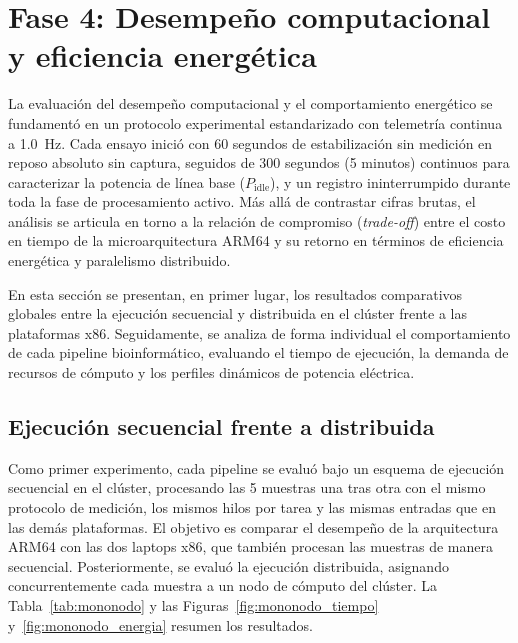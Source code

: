 \documentclass[12pt,oneside,spanish]{book}
\begin{document}
    \section{Fase 4: Desempeño computacional y eficiencia energética}
    \label{sec:fase4}
    
    La evaluación del desempeño computacional y el comportamiento energético se fundamentó en un protocolo experimental estandarizado con telemetría continua a 1.0~Hz. Cada ensayo inició con 60 segundos de estabilización sin medición en reposo absoluto sin captura, seguidos de 300 segundos (5 minutos) continuos para caracterizar la potencia de línea base ($P_{\text{idle}}$), y un registro ininterrumpido durante toda la fase de procesamiento activo. Más allá de contrastar cifras brutas, el análisis se articula en torno a la relación de compromiso (\textit{trade-off}) entre el costo en tiempo de la microarquitectura ARM64 y su retorno en términos de eficiencia energética y paralelismo distribuido.
    
    En esta sección se presentan, en primer lugar, los resultados comparativos globales entre la ejecución secuencial y distribuida en el clúster frente a las plataformas x86. Seguidamente, se analiza de forma individual el comportamiento de cada pipeline bioinformático, evaluando el tiempo de ejecución, la demanda de recursos de cómputo y los perfiles dinámicos de potencia eléctrica.
    
    
    \subsection{Ejecución secuencial frente a distribuida}
    
    Como primer experimento, cada pipeline se evaluó bajo un esquema de ejecución secuencial en el clúster, procesando las 5 muestras una tras otra con el mismo protocolo de medición, los mismos hilos por tarea y las mismas entradas que en las demás plataformas. El objetivo es comparar el desempeño de la arquitectura ARM64 con las dos laptops x86, que también procesan las muestras de manera secuencial. Posteriormente, se evaluó la ejecución distribuida, asignando concurrentemente cada muestra a un nodo de cómputo del clúster. La Tabla~\ref{tab:mononodo} y las Figuras~\ref{fig:mononodo_tiempo} y~\ref{fig:mononodo_energia} resumen los resultados.
    
\end{document}
